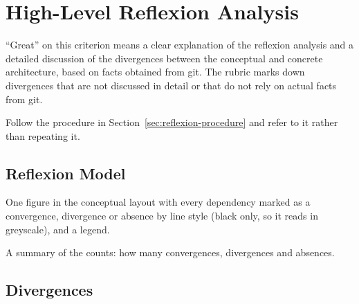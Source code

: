\section{High-Level Reflexion Analysis}
\label{sec:reflexion}


\begin{requirements}
  \item ``Great'' on this criterion means a clear explanation of the reflexion analysis and a detailed discussion of the divergences between the conceptual and concrete architecture, based on facts obtained from git. The rubric marks down divergences that are not discussed in detail or that do not rely on actual facts from git.
  \item Follow the procedure in Section~\ref{sec:reflexion-procedure} and refer to it rather than repeating it.
\end{requirements}

\subsection{Reflexion Model}
\label{sec:reflexion-model}

\begin{requirements}
  \item One figure in the conceptual layout with every dependency marked as a convergence, divergence or absence by line style (black only, so it reads in greyscale), and a legend.
  \item A summary of the counts: how many convergences, divergences and absences.
\end{requirements}

\subsection{Divergences}
\label{sec:divergences}

